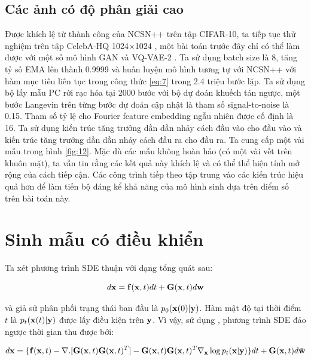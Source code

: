 \documentclass{article} %
\begin{document}
\subsection{Các ảnh có độ phân giải cao} \label{H.3}

Được khích lệ từ thành công của NCSN++ trên tập CIFAR-10, ta tiếp tục thử nghiệm trên tập CelebA-HQ 1024$\times$1024 \citep{karras2018progressive}, một bài toán trước đây chỉ có thể làm được với một số mô hình GAN và VQ-VAE-2 \citep{razavi2019generating}.
Ta sử dụng batch size là 8, tăng tỷ số EMA lên thành 0.9999 và huấn luyện mô hình tương tự với NCSN++ với hàm mục tiêu liên tục trong công thức \ref{eq:7} trong 2.4 triệu bước lặp.
Ta sử dụng bộ lấy mẫu PC rời rạc hóa tại 2000 bước với bộ dự đoán khuếch tán ngược, một bước Langevin trên từng bước dự đoán cập nhật là tham số signal-to-noise là 0.15.
Tham số tỷ lệ cho Fourier feature embedding ngẫu nhiên được cố định là 16.
Ta sử dụng kiến trúc tăng trưởng dần dần nhảy cách đầu vào cho đầu vào và kiến trúc tăng trưởng dần dần nhảy cách đầu ra cho đầu ra.
Ta cung cấp một vài mẫu trong hình \ref{fig:12}.
Mặc dù các mẫu không hoàn hảo (có một vài vết trên khuôn mặt), ta vẫn tin rằng các kết quả này khích lệ và có thể thể hiện tính mở rộng của cách tiếp cận.
Các công trình tiếp theo tập trung vào các kiến trúc hiệu quả hơn để làm tiến bộ đáng kể khả năng của mô hình sinh dựa trên điểm số trên bài toán này.

\section{Sinh mẫu có điều khiển} \label{I}

Ta xét phương trình SDE thuận với dạng tổng quát sau:

\begin{equation*}
    d \bold{x} = \bold{f}(\bold{x}, t) dt + \bold{G} (\bold{x}, t) d\bold{w}
\end{equation*}

và giả sử phân phối trạng thái ban đầu là $p_0(\bold{x}(0) \vert \bold{y})$.
Hàm mật độ tại thời điểm $t$ là $p_t(\bold{x}(t) \vert \bold{y})$ được lấy điều kiện trên $\bold{y}$.
Vì vậy, sử dụng \citep{anderson1982reverse}, phương trình SDE đảo ngược thời gian thu được bởi:

\begin{equation} \label{eq:48}
    d \bold{x} = \lbrace \bold{f}(\bold{x}, t) - \nabla . \lbrack \bold{G}(\bold{x}, t) \bold{G}(\bold{x}, t)^T \rbrack - \bold{G}(\bold{x}, t)\bold{G}(\bold{x}, t)^T \nabla_{\bold{x}} \log p_t (\bold{x} \vert \bold{y}) \rbrace dt + \bold{G}(\bold{x}, t)  d \bar{\bold{w}}
\end{equation}
\end{document}
